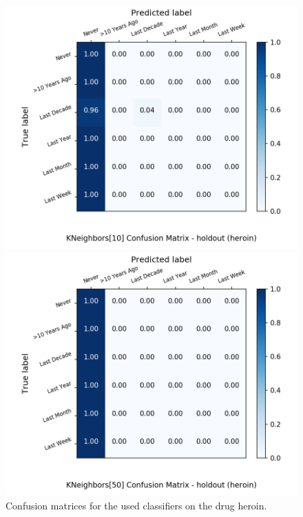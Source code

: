 \begin{figure}[H]
\begin{minipage}[b]{0.32\textwidth}
		\includegraphics[width=1.1\textwidth]{Plots/heroin_KNeighbors_10_balance_False_holdout.png}
  \end{minipage}
	\begin{minipage}[b]{0.32\textwidth}
		\includegraphics[width=1.1\textwidth]{Plots/heroin_KNeighbors_50_balance_False_holdout.png}
  \end{minipage}
	\caption{Confusion matrices for the used classifiers on the drug heroin.}
\end{figure}

